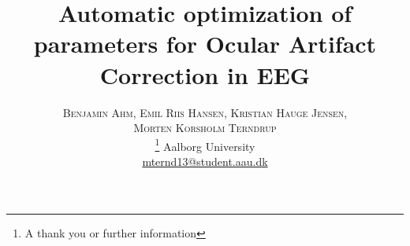 \documentclass[twoside]{article}
\title{\vspace{-15mm}\fontsize{24pt}{10pt}\selectfont\textbf{Automatic optimization of parameters for Ocular Artifact Correction in EEG}} %
\author{
\large
\textsc{Benjamin Ahm, } %
\textsc{Emil Riis Hansen, }
\textsc{Kristian Hauge Jensen, }\\
\textsc{Morten Korsholm Terndrup}\\[2mm]\thanks{A thank you or further information}
\normalsize Aalborg University \\ %
\normalsize \href{mailto:mternd13@student.aau.dk}{mternd13@student.aau.dk} %
\vspace{-5mm}
}
\date{}
\begin{document}
\maketitle %

\thispagestyle{fancy} %





\begin{multicols}{2} %





















\end{multicols}
\listoftodos
\end{document}
